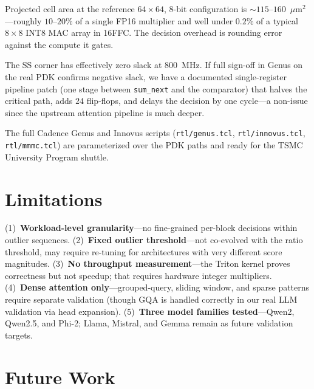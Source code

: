 \documentclass[10pt,twocolumn]{article}
\begin{document}
Projected cell area at the reference $64\times64$, $8$-bit configuration
is $\sim\!115$--$160$~$\mu$m$^2$---roughly $10$--$20\%$ of a single
FP16 multiplier and well under $0.2\%$ of a typical $8\times8$ INT8
MAC array in 16FFC. The decision overhead is rounding error against
the compute it gates.

The SS corner has effectively zero slack at $800$~MHz. If full sign-off
in Genus on the real PDK confirms negative slack, we have a documented
single-register pipeline patch (one stage between
\texttt{sum\_next} and the comparator) that halves the critical path,
adds $24$ flip-flops, and delays the decision by one cycle---a non-issue
since the upstream attention pipeline is much deeper.

The full Cadence Genus and Innovus scripts (\texttt{rtl/genus.tcl},
\texttt{rtl/innovus.tcl}, \texttt{rtl/mmmc.tcl}) are parameterized over
the PDK paths and ready for the TSMC University Program shuttle.

\section{Limitations}

(1)~\textbf{Workload-level granularity}---no
fine-grained per-block decisions within outlier sequences.
(2)~\textbf{Fixed outlier threshold}---not co-evolved with the ratio
threshold, may require re-tuning for architectures with very different
score magnitudes.
(3)~\textbf{No throughput measurement}---the Triton kernel proves
correctness but not speedup; that requires hardware integer multipliers.
(4)~\textbf{Dense attention only}---grouped-query, sliding window, and
sparse patterns require separate validation (though GQA is handled
correctly in our real LLM validation via head expansion).
(5)~\textbf{Three model families tested}---Qwen2, Qwen2.5, and Phi-2;
Llama, Mistral, and Gemma remain as future validation targets.

\section{Future Work}
\end{document}
